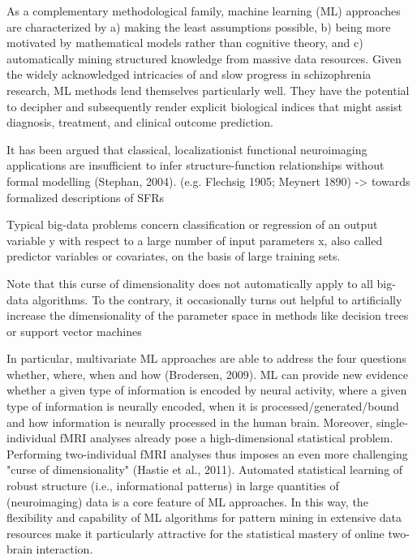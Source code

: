 \documentclass[authoryear,review,3p]{elsarticle}
\begin{document}
As a complementary methodological family, machine learning (ML) approaches are characterized by a) making the least assumptions possible, b) being more motivated by mathematical models rather than cognitive theory, and c) automatically mining structured knowledge from massive data resources. Given the widely acknowledged intricacies of and slow progress in schizophrenia research, ML methods lend themselves particularly well. They have the potential to decipher and subsequently render explicit biological indices that might assist diagnosis, treatment, and clinical outcome prediction.

It has been argued that classical, localizationist functional neuroimaging applications
are insufficient to infer structure-function relationships
without formal modelling (Stephan, 2004).
(e.g. Flechsig 1905; Meynert 1890)
-> towards formalized descriptions of SFRs

Typical big-data problems concern classification or regression of an output variable y with respect to a large number of input parameters x, also called predictor variables or covariates, on the basis of large training sets. 


Note that this curse of dimensionality does not automatically apply to all big-data algorithms. To the contrary, it occasionally turns out helpful to artificially increase the dimensionality of the parameter space in methods like decision trees or support vector machines 






In particular, multivariate ML approaches are able to address the four questions whether, where, when and how (Brodersen, 2009). ML can provide new evidence whether a given type of information is encoded by neural activity, where a given type of information is neurally encoded, when it is processed/generated/bound and how information is neurally processed in the human brain. Moreover, single-individual fMRI analyses already pose a high-dimensional statistical problem. Performing two-individual fMRI analyses thus imposes an even more challenging "curse of dimensionality" (Hastie et al., 2011). Automated statistical learning of robust structure (i.e., informational patterns) in large quantities of (neuroimaging) data is a core feature of ML approaches. In this way, the flexibility and capability of ML algorithms for pattern mining in extensive data resources make it particularly attractive for the statistical mastery of online two-brain interaction.
\end{document}
